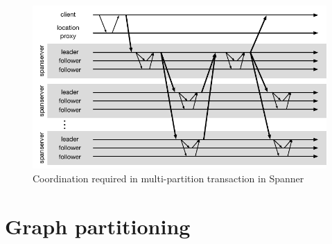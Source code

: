 \begin{figure}
  \begin{minipage}[b]{1.0\linewidth}
  \centering
        \includegraphics[width=0.6\linewidth]{figures/spanner}
  \end{minipage}
  \caption{Coordination required in multi-partition transaction in Spanner}
  \label{fig:spanner}
\end{figure}

\section{Graph partitioning}









